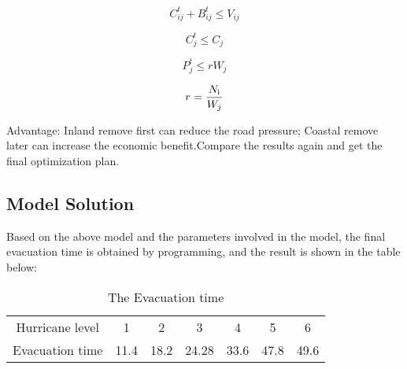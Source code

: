 \documentclass{mcmthesis}	%
\begin{document}
\begin{equation}\label{12}
C_{ij}^t + B_{ij}^t \le {V_{ij}}
\end{equation}


\begin{equation}\label{13}
C_j^t \le {C_j}
\end{equation}

\begin{equation}\label{14}
P_j^t \le r{W_j}
\end{equation}

\begin{equation}\label{15}
r = \frac{{{N_{\rm{i}}}}}{{{W_j}}}
\end{equation}

%

Advantage: Inland remove first can reduce the road pressure; Coastal remove later can increase the economic benefit.Compare the results again and get the final optimization plan.

\subsection{Model Solution}
Based on the above model and the parameters involved in the model, the final evacuation time is obtained by programming, and the result is shown in the table below:
\begin{table}[!htb]
\centering
\setlength{\abovecaptionskip}{0pt}%
\setlength{\belowcaptionskip}{10pt}%
\caption{The Evacuation time}
\begin{tabular}{ccccccc}%
\toprule[1.5pt]
Hurricane level &1&2&3&4&5&6\\
Evacuation time &11.4&18.2&24.28&33.6&47.8&49.6\\
\bottomrule[1.5pt]
\end{tabular}
\end{table}
\end{document}
